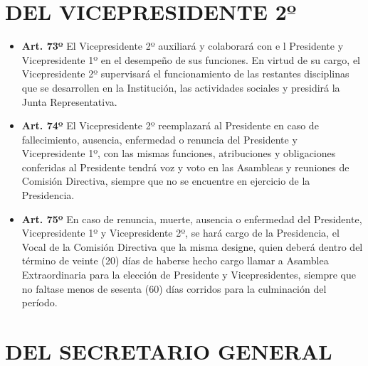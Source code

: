 \documentclass[]{book}
\providecommand{\tightlist}{%
  \setlength{\itemsep}{0pt}\setlength{\parskip}{0pt}}
\begin{document}
\chapter{DEL VICEPRESIDENTE 2º}\label{del-vicepresidente-2}

\begin{itemize}
\tightlist
\item
  \textbf{Art. 73º} El Vicepresidente 2º auxiliará y colaborará con e l
  Presidente y Vicepresidente 1º en el desempeño de sus funciones. En
  virtud de su cargo, el Vicepresidente 2º supervisará el funcionamiento
  de las restantes disciplinas que se desarrollen en la Institución, las
  actividades sociales y presidirá la Junta Representativa.
\end{itemize}

\begin{itemize}
\tightlist
\item
  \textbf{Art. 74º} El Vicepresidente 2º reemplazará al Presidente en
  caso de fallecimiento, ausencia, enfermedad o renuncia del Presidente
  y Vicepresidente 1º, con las mismas funciones, atribuciones y
  obligaciones conferidas al Presidente tendrá voz y voto en las
  Asambleas y reuniones de Comisión Directiva, siempre que no se
  encuentre en ejercicio de la Presidencia.
\end{itemize}

\begin{itemize}
\tightlist
\item
  \textbf{Art. 75º} En caso de renuncia, muerte, ausencia o enfermedad
  del Presidente, Vicepresidente 1º y Vicepresidente 2º, se hará cargo
  de la Presidencia, el Vocal de la Comisión Directiva que la misma
  designe, quien deberá dentro del término de veinte (20) días de
  haberse hecho cargo llamar a Asamblea Extraordinaria para la elección
  de Presidente y Vicepresidentes, siempre que no faltase menos de
  sesenta (60) días corridos para la culminación del período.
\end{itemize}

\chapter{DEL SECRETARIO GENERAL}\label{del-secretario-general}
\end{document}
